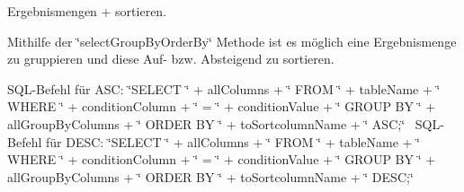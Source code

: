 Ergebnismengen + sortieren. 

Mithilfe der \char`\"{}select\+Group\+By\+Order\+By\char`\"{} Methode ist es möglich eine Ergebnismenge zu gruppieren und diese Auf-\/ bzw. Absteigend zu sortieren.~\newline


S\+Q\+L-\/\+Befehl für A\+SC\+: \char`\"{}\+S\+E\+L\+E\+C\+T \char`\"{} + all\+Columns + \char`\"{} F\+R\+O\+M \char`\"{} + table\+Name + \char`\"{} W\+H\+E\+R\+E \char`\"{} + condition\+Column + \char`\"{} = \textquotesingle{}\char`\"{} + condition\+Value + \char`\"{}\textquotesingle{} G\+R\+O\+U\+P B\+Y \char`\"{} + all\+Group\+By\+Columns + \char`\"{} O\+R\+D\+E\+R B\+Y \char`\"{} + to\+Sortcolumn\+Name + \char`\"{} A\+S\+C;\char`\"{}~\newline
 S\+Q\+L-\/\+Befehl für D\+E\+SC\+: \char`\"{}\+S\+E\+L\+E\+C\+T \char`\"{} + all\+Columns + \char`\"{} F\+R\+O\+M \char`\"{} + table\+Name + \char`\"{} W\+H\+E\+R\+E \char`\"{} + condition\+Column + \char`\"{} = \textquotesingle{}\char`\"{} + condition\+Value + \char`\"{}\textquotesingle{} G\+R\+O\+U\+P B\+Y \char`\"{} + all\+Group\+By\+Columns + \char`\"{} O\+R\+D\+E\+R B\+Y \char`\"{} + to\+Sortcolumn\+Name + \char`\"{} D\+E\+S\+C;\char`\"{}~\newline



